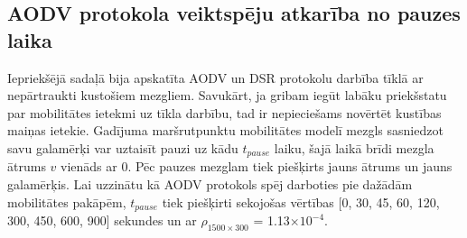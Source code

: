 \subsection{AODV protokola veiktspēju atkarība no pauzes laika}
Iepriekšējā sadaļā bija apskatīta AODV un DSR protokolu darbība tīklā  ar nepārtraukti kustošiem mezgliem. Savukārt, ja gribam iegūt labāku priekšstatu par mobilitātes ietekmi uz tīkla darbību, tad ir nepieciešams novērtēt kustības maiņas ietekie. Gadījuma maršrutpunktu mobilitātes modelī mezgls sasniedzot savu galamērķi var uztaisīt pauzi uz kādu  $t_{pause}$ laiku, šajā laikā brīdi mezgla ātrums $v$ vienāds ar 0. Pēc pauzes mezglam tiek piešķirts jauns ātrums un jauns galamērķis. Lai uzzinātu kā AODV protokols spēj darboties pie dažādām mobilitātes pakāpēm, $t_{pause}$ tiek piešķirti sekojošas vērtības [0, 30, 45, 60, 120, 300, 450, 600, 900] sekundes un ar $\rho_{1500\times300}$ = 1.13$\times10^{-4}$.


